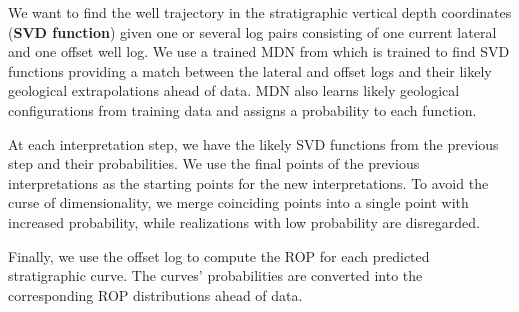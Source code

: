 

We want to find the well trajectory in the stratigraphic vertical depth coordinates (\textbf{SVD function}) given one or several log pairs consisting of one current lateral and one offset well log. 
We use a trained MDN from \cite{multi-modal-journal} which is trained  to find SVD functions providing a match between the lateral and offset logs and their likely geological extrapolations ahead of data.  
MDN also learns likely geological configurations from training data and assigns a probability to each function.



At each interpretation step, we have the likely SVD functions from the previous step and their probabilities. We use the final points of the previous interpretations as the starting points for the new interpretations. To avoid the curse of dimensionality, we merge coinciding points into a single point with increased probability, while realizations with low probability are disregarded. 

Finally, we use the offset log to compute the ROP for each predicted stratigraphic curve. 
The curves' probabilities are converted into the corresponding ROP distributions ahead of data.
